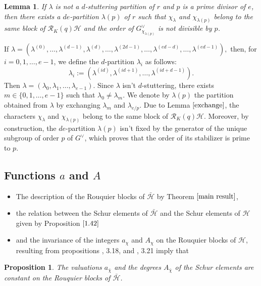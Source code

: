 \documentclass[10pt,a4paper,titlepage]{article}
\newtheorem{lemma}[theorem]{Lemma}
\newtheorem{proposition}[theorem]{Proposition}
\newcommand{\el}{\lambda}
\begin{document}
\begin{lemma}\label{last lemma}
If  $\el$ is not a $d$-stuttering partition of $r$ and $p$ is a prime divisor of $e$, then there exists a
$de$-partition $\el(p)$ of $r$ such that $\chi_\el$ and $\chi_{\el(p)}$ belong to the same block of
$\mathcal{R}_K(q)\mathcal{H}$ and  the order of $G^\vee_{\chi_{\el(p)}}$ is not divisible by $p$.
\end{lemma}
\begin{apod}{If $\el=(\el^{(0)},\ldots,\el^{(d-1)},\el^{(d)},\ldots,\el^{(2d-1)},\ldots,\el^{(ed-d)},\ldots,\el^{(ed-1)}),$
then, for $i=0,1,\ldots,e-1$, we define the $d$-partition $\el_i$ as follows:
$$\el_i:=(\el^{(id)},\el^{(id+1)},\ldots,\el^{(id+d-1)}).$$
Then $\el=(\el_0,\el_1,\ldots,\el_{e-1}).$ Since $\el$ isn't $d$-stuttering, there exists $m \in \{ 0, 1,\ldots,e-1\}$ such that $\el_0 \neq \el_m$. We denote by $\el(p)$ the partition obtained from $\el$ by exchanging $\el_m$ and $\el_{e/p}$. Due to Lemma $\ref{exchange}$, the characters $\chi_\el$ and
$\chi_{\el(p)}$ belong to the same block of $\mathcal{R}_K(q)\mathcal{H}$.
Moreover, by construction, the $de$-partition $\el(p)$ isn't fixed by the generator of the unique subgroup of order $p$ of $G^\vee$, which proves that the order of its stabilizer is prime to $p$.}
\end{apod}


\subsection*{\normalsize Functions $a$ and $A$}

\begin{itemize}
\item The description of the Rouquier blocks of $\bar{\mathcal{H}}$ by Theorem $\ref{main result}$,
\item the relation between the Schur elements of $\bar{\mathcal{H}}$
and the Schur elements of $\mathcal{H}$ given by Proposition $\ref{1.42}$
\item and the invariance of the integers $a_\chi$ and $A_\chi$ on the Rouquier blocks of $\mathcal{H}$, resulting from propositions \cite{BK}, 3.18, and \cite{Chlou2}, 3.21  imply that
\end{itemize}

\begin{proposition}\label{fin}
The valuations $a_{\bar{\chi}}$ and the degrees $A_{\bar{\chi}}$ of the Schur elements are constant on the Rouquier blocks of $\bar{\mathcal{H}}$.
\end{proposition}
\end{document}
